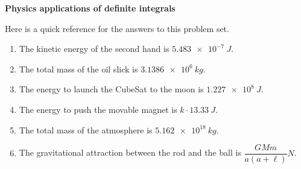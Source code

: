 \documentclass[12pt]{article}
\renewcommand{\section}[1]{\begin{center} \textbf{#1} \\\end{center}}
\begin{document}
%


\allowdisplaybreaks
\section{Physics applications of definite integrals}
Here is a quick reference for the answers to this problem set.

\hrulefill

\begin{enumerate}
\item The kinetic energy of the second hand is $\SI{5.483e-7}{J}$.

\item The total mass of the oil slick is $\SI{3.1386e6}{kg}.$

\item The energy to launch the CubeSat to the moon is $\SI{1.227e8}{J}$.

\item The energy to push the movable magnet is $k\cdot\SI{13.33}{J}$.

\item The total mass of the atmosphere is $\SI{5.162e18}{kg}$.

\item The gravitational attraction between the rod and the ball is $\dfrac{GMm}{a(a+\ell)} \si{N}$.
\end{enumerate}
\end{document}
